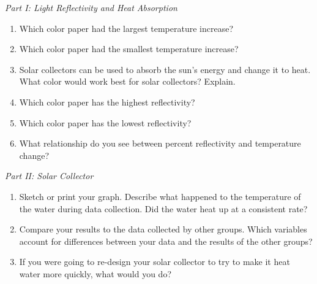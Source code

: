 \documentclass[english,twoside]{article}
\begin{document}
\textit{Part I: Light Reflectivity and Heat Absorption}
\begin{enumerate}
	\item Which color paper had the largest temperature increase?
	\answerspace{2.5in}
	\item Which color paper had the smallest temperature increase?
	\answerspace{2.5in}
	\item Solar collectors can be used to absorb the sun's energy and change it to heat. What color would work best for solar collectors? Explain.
	\answerspace{3.0in}
	\item Which color paper has the highest reflectivity?
	\answerspace{2.5in}
	\item Which color paper has the lowest reflectivity?
	\answerspace{2.5in}
	\item What relationship do you see between percent reflectivity and temperature change?
	\answerspace{3.0in}
\end{enumerate}

\textit{Part II: Solar Collector}
\begin{enumerate} 
	\item Sketch or print your graph. Describe what happened to the temperature of the water during data collection. Did the water heat up at a consistent rate?
	\answerspace{3.5in}
	\item Compare your results to the data collected by other groups. Which variables account for differences between your data and the results of the other groups?
	\answerspace{2.5in}
	\item If you were going to re-design your solar collector to try to make it heat water more quickly, what would you do?
	\answerspace{2.5in}
\end{enumerate}
\end{document}
